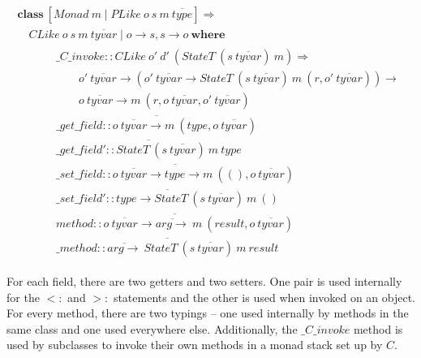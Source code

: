 \documentclass[runningheads,a4paper]{llncs}
\begin{document}
\begin{displaymath}
\begin{array}{l}
\mathbf{class}~[\mathit{Monad}~m \mid \mathit{PLike}~o~s~m~\overline{\mathit{type}}] \Rightarrow \\
\quad \mathit{CLike}~o~s~m~\overline{\mathit{tyvar}} \mid o \to s, s \to o~\mathbf{where} \\
\qquad \quad \begin{array}{l}
\_\mathit{C}\_\mathit{invoke} :: \mathit{CLike}~o'~d'~(\mathit{StateT}~(s~\overline{\mathit{tyvar}})~m) \Rightarrow \\
\qquad o'~\overline{\mathit{tyvar}} \to (o'~\overline{\mathit{tyvar}} \to \mathit{StateT}~(s~\overline{\mathit{tyvar}})~m~(r,o'~\overline{\mathit{tyvar}})) \to\\\qquad
                                  o~\overline{\mathit{tyvar}} \to m~(r,o~\overline{\mathit{tyvar}},o'~\overline{\mathit{tyvar}}) \\
\overline{\_\mathit{get}\_\mathit{field} :: o~\overline{\mathit{tyvar}} \to m~(\mathit{type}, o~\overline{\mathit{tyvar}}) } \\
\overline{\_\mathit{get}\_\mathit{field}' :: \mathit{StateT}~(s~\overline{\mathit{tyvar}})~m~\mathit{type}} \\
\overline{\_\mathit{set}\_\mathit{field} :: o~\overline{\mathit{tyvar}} \to \mathit{type} \to m~((),o~\overline{\mathit{tyvar}})} \\
\overline{\_\mathit{set}\_\mathit{field}' :: \mathit{type} \to \mathit{StateT}~(s~\overline{\mathit{tyvar}})~m~()} \\
\overline{\mathit{method} :: o~\overline{\mathit{tyvar}} \to \overline{\mathit{arg} \to}~m~(\mathit{result},o~\overline{\mathit{tyvar}})}\\
\overline{\_\mathit{method} :: \overline{\mathit{arg} \to}~ \mathit{StateT}~(s~\overline{\mathit{tyvar}})~m~\mathit{result} }
\end{array}
\end{array}
\end{displaymath}

For each field, there are two getters and two setters. One pair is used internally for the $<:$ and $>:$ statements and the other is used when invoked on an object. For every method, there are two typings -- one used internally by methods in the same class and one used everywhere else. Additionally, the $\_\mathit{C}\_\mathit{invoke}$ method is used by subclasses to invoke their own methods in a monad stack set up by $C$.
\end{document}
